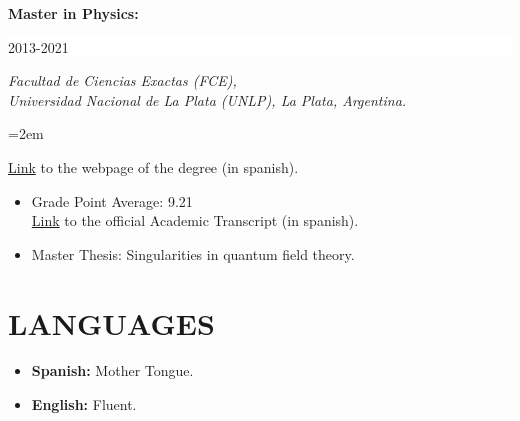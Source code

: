 \documentclass[paper=letter,fontsize=11pt]{scrartcl} %
\newcommand{\sepspace}{\vspace*{1em}}		%
\newcommand{\NewPart}[2]{\section*{\uppercase{#1} \small \normalfont #2}}
\newcommand{\EducationEntry}[4]{
		\noindent \textbf{#1} \hfill      %
		\colorbox{White}{%
			\parbox{6em}{%
			\hfill\color{Black}#2}} \par  %
		\noindent \textit{#3} \par        %
		\noindent\hangindent=2em\hangafter=0 \small #4 %
		\normalsize \par}
\newcommand{\WorkEntry}[5]{
		\noindent \textbf{#1}
        \noindent \small \textit{#2}
        \hfill      %
        \colorbox{White}{%
			\parbox{6em}{%
			\hfill\color{Black}#3}} \par  %
		\noindent \textit{#4} \par        %
		\noindent\hangindent=2em\hangafter=0 \small #5 %
		\normalsize \par}
\newcommand{\Text}[1]{\par       
		\noindent \small #1 
		\normalsize \par}
\begin{document}
\EducationEntry{Master in Physics: } {2013-2021}{Facultad de Ciencias Exactas (FCE), \\ Universidad Nacional de La Plata (UNLP), La Plata, Argentina.}{

{\href{http://www.exactas.unlp.edu.ar/licenciatura_en_fisica}{Link}} to the webpage of the degree (in spanish).
\begin{itemize}
\item{Grade Point Average: 9.21 \\ {\href{https://drive.google.com/drive/folders/1je8C0gsbGixCF5rJo3fzQaqo1cs2mjX7?usp=sharing}{Link}} to the official Academic Transcript (in spanish).}
\item{Master Thesis: Singularities in quantum field theory.}
\end{itemize}

}

\sepspace




\NewPart{LANGUAGES}{}

\begin{itemize}
\item \textbf{Spanish:} Mother Tongue.
\item \textbf{English:} Fluent.
\end{itemize}




\begin{comment}


\NewPart{Interests and personality}{}

\Text{Sports and outdoor activities, mainly freeride skiing. The last couple of years I have been competing in freeride skiing and been partially living in the Swiss Alps. Through my skiing I have also developed my ski production. My friends and family form my other big interest. I see myself as a happy, outgoing and reliable person. I am a problem solver and no challenge is too big. The result of my work is often better than expected.}




\NewPart{Expected Salary:}{}

\WorkEntry{}{}{}{}{
\begin{itemize}
\item{My expected salary is in the 700 to 800 USD range.}
\end{itemize}
}

\end{comment}
\end{document}
